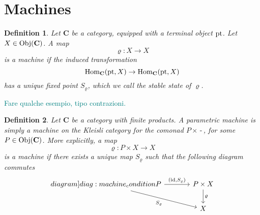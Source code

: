 \documentclass[12pt]{article}
\newtheorem{definition}{Definition}
\newcommand{\pietro}[1]{\textcolor{teal}{#1}}
\newcommand{\pt}{{\textnormal{pt}}}
\newcommand{\Hom}{{\textnormal{Hom}}}
\newcommand{\Obj}{{\textnormal{Obj}}}
\newcommand{\id}{{\textnormal{id}}}
\newcommand{\Cat}{{\mathbf{C}}}
\newcommand{\FCoalg}{{F\textnormal{-coalg}}}
\newcommand{\anon}{{\,\mbox{-}\,}}
\begin{document}

\section{Machines}

\begin{definition}\label{def:machine}
    Let $\Cat$ be a category, equipped with a terminal object $\pt$. Let $X \in \Obj(\Cat)$. A map
    \begin{equation*}
        \varrho \colon X \rightarrow X
    \end{equation*}
    is a {\em machine} if the induced transformation
    \begin{equation*}
        \Hom_\Cat(\pt, X) \rightarrow \Hom_\Cat(\pt, X)
    \end{equation*}
    has a unique fixed point $S_\varrho$, which we call the {\em stable state} of $\varrho$.
\end{definition}

\pietro{Fare qualche esempio, tipo contrazioni.}

\begin{definition}\label{def:parametric_machine}
    Let $\Cat$ be a category with finite products. A {\em parametric machine} is simply a machine on the Kleisli category for the comonad $P \times \anon$, for some $P \in \Obj(\Cat)$. More explicitly, a map
    \begin{equation*}
        \varrho \colon P \times X \rightarrow X
    \end{equation*}
    is a {\em machine} if there exists a unique map $S_\varrho$ such that the following diagram commutes
    \begin{equation}
        \begin{tikzcd}[column sep=large]\label[diagram]{diag:machine_condition}
            P \arrow[rightarrow]{r}{\left(\id, S_\varrho\right)}
            \arrow[rightarrow,swap]{dr}{S_\varrho}
            & P \times X \arrow[rightarrow]{d}{\varrho} \\
            & X
        \end{tikzcd}
    \end{equation}
\end{definition}
\end{document}
